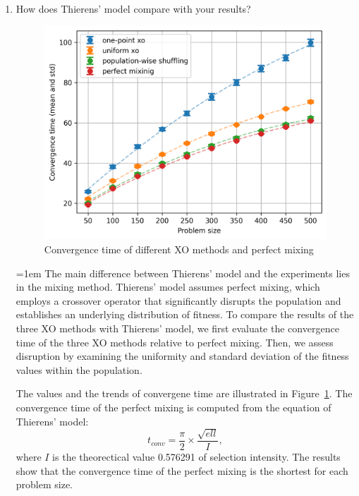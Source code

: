 \documentclass{article}
\begin{document}
\begin{enumerate}[label=(\alph*)]
      \vspace{0.5em}

      \item
      How does Thierens’ model compare with your results?

      \begin{figure}[ht]
            \centering
            \includegraphics[width=0.7\linewidth]{fig-tconv_perfect.png}
            \caption{Convergence time of different XO methods and perfect mixing}
            \label{fig:tconv_perfect}
      \end{figure}
      
      \parindent=1em
      The main difference between Thierens' model and the experiments lies in the mixing method. 
      Thierens' model assumes perfect mixing, which employs a crossover operator that significantly disrupts the population 
      and establishes an underlying distribution of fitness. To compare the results of the three XO methods with Thierens' model, 
      we first evaluate the convergence time of the three XO methods relative to perfect mixing. 
      Then, we assess disruption by examining the uniformity and standard deviation of the fitness values within the population.
      
      The values and the trends of convergene time are illustrated in Figure~\ref{fig:tconv_perfect}.
      The convergence time of the perfect mixing is computed from the equation of Thierens' model:
      \begin{equation*}
            t_{conv} = \frac{\pi}{2} \times \frac{\sqrt{ell}}{I},
      \end{equation*}
      where $I$ is the theorectical value 0.576291 of selection intensity.
      The results show that the convergence time of the perfect mixing is the shortest for each problem size.

      \vspace{1.5em}
      

\end{enumerate}
\end{document}
